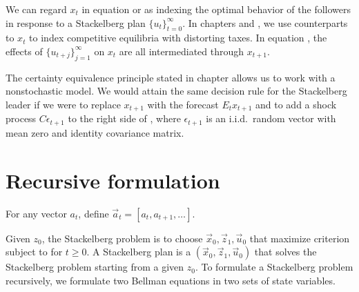%

We can regard $x_t$ in equation  or  as indexing the optimal behavior of the followers
in response to a Stackelberg plan $\{u_t\}_{t=0}^\infty$.  In chapters  and  , we use counterparts to $x_t$ to index
competitive equilibria with distorting taxes.  In equation , the effects of $\{u_{t+j}\}_{j=1}^\infty$ on $x_t$ are all
 intermediated through $x_{t+1}$.


The   certainty equivalence principle
stated in chapter  allows us
to  work with a nonstochastic model.
 We would attain the
same decision rule for the Stackelberg leader   if we were  to replace
$x_{t+1}$ with the forecast $E_t x_{t+1}$ and to add  a shock process
$C \epsilon_{t+1}$ to the right side of , where
$\epsilon_{t+1}$ is an i.i.d.\ random vector
 with mean   zero
and identity covariance matrix.


\section{Recursive formulation}\label{recurstack}%
For any vector $a_t$, define $\vec a_t = [a_t, a_{t+1}, \ldots]$.

 Given $z_0$, the Stackelberg problem is to choose $\vec x_0, \vec z_1, \vec u_0$ that maximize
 criterion  subject to  for $t \geq 0$.  A Stackelberg plan is a $(\vec x_0, \vec z_1, \vec u_0)$ that solves the Stackelberg problem starting from a given $z_0$. To formulate a Stackelberg problem recursively,
 we formulate two Bellman equations in two sets of  state variables.

